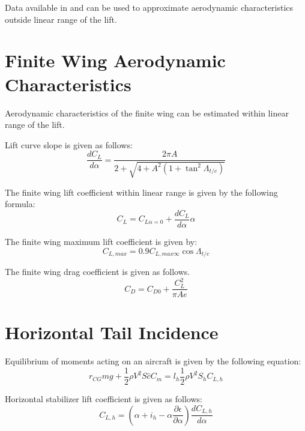 Data available in \cite{NACA-TN-3361} and \cite{SheldahiKlimas1981} can be used to approximate aerodynamic characteristics outside linear range of the lift.

\section{Finite Wing Aerodynamic Characteristics}

Aerodynamic characteristics of the finite wing can be estimated within linear range of the lift.

Lift curve slope is given as follows: \cite{Corke2003}
\begin{equation}
  \frac{dC_L}{d\alpha}
  =
  \frac{
    2\pi A
  }
  {
    2
    +
    \sqrt{ 4 + A^2 \left( 1 + \tan^2 \Lambda_{t/c} \right) }
  }
\end{equation}

The finite wing lift coefficient within linear range is given by the following formula: \cite{Corke2003}
\begin{equation}
  C_L = C_{L \alpha = 0} + \frac{dC_L}{d \alpha} \alpha
\end{equation}

The finite wing maximum lift coefficient is given by: \cite{Raymer1992}
\begin{equation}
  C_{L,max} = 0.9 C_{L,max \infty} \cos \Lambda_{t/c}
\end{equation}

The finite wing drag coefficient is given as follows. \cite{Corke2003}
\begin{equation}
  C_D = C_{D0} + \frac{C_L^2}{\pi A e}
\end{equation}

\section{Horizontal Tail Incidence}

Equilibrium of moments acting on an aircraft is given by the following equation:
\begin{equation}
  \label{eq-aero-equilibrium-moments}
  r_{CG} mg + \frac{1}{2} \rho V^2 S \hat c C_m
  =
  l_h \frac{1}{2} \rho V^2 S_h C_{L,h}
\end{equation}

Horizontal stabilizer lift coefficient is given as follows:
\begin{equation}
  \label{eq-aero-lift-coef-stab-h}
  C_{L,h}
  =
  \left(
    \alpha + i_h - \alpha \frac{\partial \epsilon}{\partial \alpha}
  \right)
  \frac{d C_{L,h}}{d \alpha}
\end{equation}

